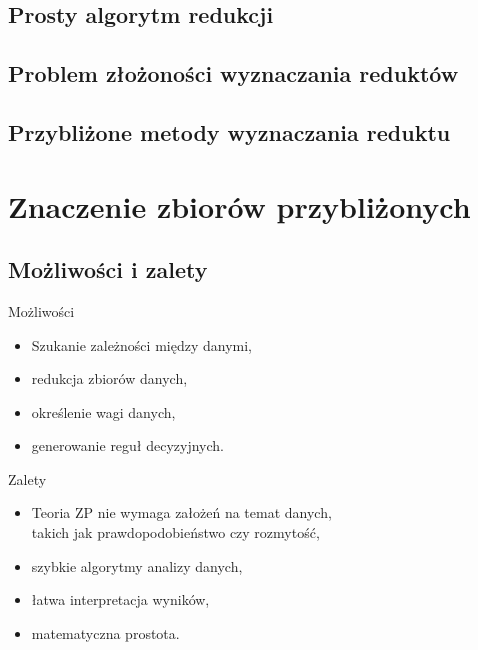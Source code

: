 \documentclass[10pt]{beamer}
\begin{document}
\subsection{Prosty algorytm redukcji}

\subsection{Problem złożoności wyznaczania reduktów}

\subsection{Przybliżone metody wyznaczania reduktu}




\section{Znaczenie zbiorów przybliżonych}
\subsection{Możliwości i zalety}
\begin{frame}{Możliwości}
\begin{spacing}{1.5}
\begin{itemize}
\item Szukanie zależności między danymi,
\item redukcja zbiorów danych,
\item określenie wagi danych,
\item generowanie reguł decyzyjnych.
\end{itemize}
\end{spacing}
\end{frame}



\begin{frame}{Zalety}
\begin{spacing}{1.5}
\begin{itemize}
\item Teoria ZP nie wymaga założeń na temat danych,\\takich jak prawdopodobieństwo czy rozmytość,
\item szybkie algorytmy analizy danych,
\item łatwa interpretacja wyników,
\item matematyczna prostota.
\end{itemize}
\end{spacing}
\end{frame}
\end{document}

